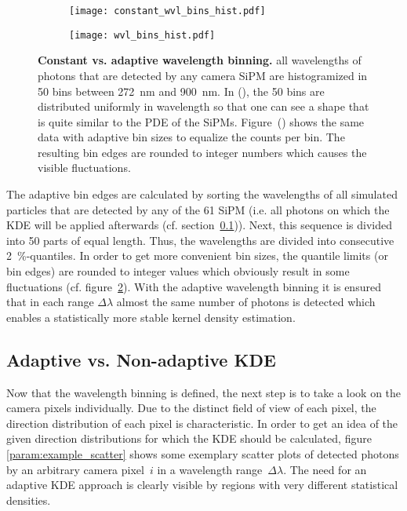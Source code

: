 \begin{figure}[H]
	\centering
	\begin{subfigure}[t]{0.49\textwidth}
		\texttt{[image: constant\_wvl\_bins\_hist.pdf]}
		\label{param:wvl_binning:constant}
	\end{subfigure}
	\hfill
	\begin{subfigure}[t]{0.49\textwidth}
		\texttt{[image: wvl\_bins\_hist.pdf]}
		\label{param:wvl_binning:adaptive}
	\end{subfigure}
	\caption[Constant vs. adaptive wavelength binning]{\textbf{Constant vs. adaptive wavelength binning.} all wavelengths of photons that are detected by any camera SiPM are histogramized in \num{50} bins between \SI{272}{\nano\meter} and \SI{900}{\nano\meter}. In (), the \num{50} bins are distributed uniformly in wavelength so that one can see a shape that is quite similar to the PDE of the SiPMs. Figure~() shows the same data with adaptive bin sizes to equalize the counts per bin. The resulting bin edges are rounded to integer numbers which causes the visible fluctuations.}
	\label{param:wvl_binning}
\end{figure}

The adaptive bin edges are calculated by sorting the wavelengths of all simulated particles that are detected by any of the 61 SiPM (i.e. all photons on which the KDE will be applied afterwards (cf. section~\ref{sec:adaptive_vs_nonadaptive})). Next, this sequence is divided into \num{50} parts of equal length. Thus, the wavelengths are divided into consecutive \SI{2}{\percent}-quantiles. In order to get more convenient bin sizes, the quantile limits (or bin edges) are rounded to integer values which obviously result in some fluctuations (cf. figure~\ref{param:wvl_binning:adaptive}).
With the adaptive wavelength binning it is ensured that in each range $\Delta\lambda$ almost the same number of photons is detected which enables a statistically more stable kernel density estimation.

\subsection{Adaptive vs. Non-adaptive KDE}\label{sec:adaptive_vs_nonadaptive}

Now that the wavelength binning is defined, the next step is to take a look on the camera pixels individually. Due to the distinct field of view of each pixel, the direction distribution of each pixel is characteristic. In order to get an idea of the given direction distributions for which the KDE should be calculated, figure \ref{param:example_scatter} shows some exemplary scatter plots of detected photons by an arbitrary camera pixel~$i$ in a wavelength range~$\Delta\lambda$. The need for an adaptive KDE approach is clearly visible by regions with very different statistical densities.

